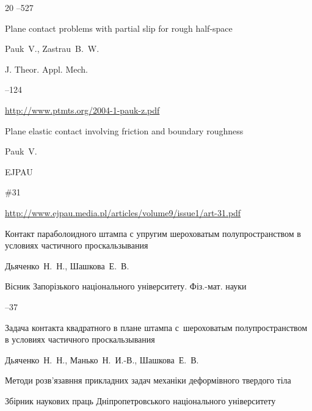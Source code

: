\begin{thebibliography}{20}
--527






\paper Plane contact problems with partial slip for rough half-space

\by Pauk~V., Zastrau~B.~W.

\jour J. Theor. Appl. Mech.




--124

\elink \url{http://www.ptmts.org/2004-1-pauk-z.pdf}






\paper Plane elastic contact involving friction and boundary roughness

\by Pauk~V.

\jour EJPAU




\papernumber \#31

\elink \url{http://www.ejpau.media.pl/articles/volume9/issue1/art-31.pdf}






\paper Контакт параболоидного штампа с упругим шероховатым полупространством в условиях частичного проскальзывания

\by Дьяченко~Н.~Н., Шашкова~Е.~В.

\jour Вісник Запорізького національного університету. Фіз.-мат. науки



--37






\paper Задача контакта квадратного в плане штампа с~шероховатым полупространством в условиях частичного проскальзывания

\by Дьяченко~Н.~Н., Манько~Н.~И.-В., Шашкова~Е.~В.

\inbook Методи розв'язавння прикладних задач механіки деформівного твердого тіла

\bookinfo Збірник наукових праць Дніпропетровського національного університету


\end{thebibliography}
